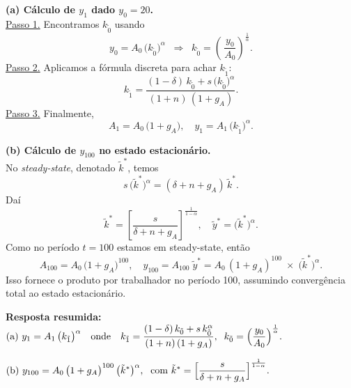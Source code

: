 \documentclass[a4paper,12pt]{article}[abntex2]
\begin{document}
\textbf{(a) Cálculo de \(y_1\) dado \(y_0=20\).}\\[3pt]
\underline{Passo 1.} Encontramos \(k_{\tilde{0}}\) usando
\[
y_0 
= 
A_0 \,\bigl(k_{\tilde{0}}\bigr)^\alpha
\;\;\Longrightarrow\;\;
k_{\tilde{0}}
=
\left(\,\frac{y_0}{A_0}\right)^{\!\frac{1}{\alpha}}.
\]
\underline{Passo 2.} Aplicamos a fórmula discreta para achar \(k_{\tilde{1}}\):
\[
k_{\tilde{1}}
=
\frac{(1-\delta)\,k_{\tilde{0}} + s\,\bigl(k_{\tilde{0}}\bigr)^\alpha}{
(1+n)\,(1+g_A)
}.
\]
\underline{Passo 3.} Finalmente,
\[
A_1 
= 
A_0\,\bigl(1+g_A\bigr),
\quad
y_1
=
A_1\,\bigl(k_{\tilde{1}}\bigr)^\alpha.
\]

\textbf{(b) Cálculo de \(y_{100}\) no estado estacionário.}\\[3pt]
No \emph{steady-state}, denotado \(\tilde{k}^*\), temos
\[
s\,\bigl(\tilde{k}^*\bigr)^\alpha
=
(\delta + n + g_A)\,\tilde{k}^*.
\]
Daí
\[
\tilde{k}^*
=
\left[
\frac{s}{\delta + n + g_A}
\right]^{\!\!\frac{1}{1-\alpha}},
\quad
\tilde{y}^* 
= 
\bigl(\tilde{k}^*\bigr)^\alpha.
\]
Como no período \(t=100\) estamos em steady-state, então
\[
A_{100}
=
A_0\,\bigl(1+g_A\bigr)^{100},
\quad
y_{100}
=
A_{100}\;\tilde{y}^*
=
A_0\,(1+g_A)^{100}\;\times\;\bigl(\tilde{k}^*\bigr)^\alpha.
\]
Isso fornece o produto por trabalhador no período 100, assumindo convergência total ao estado estacionário.

\textbf{Resposta resumida:}\\
\(\displaystyle 
\text{(a) } 
y_1 = A_1 \, \bigl(k_{\tilde{1}}\bigr)^\alpha 
\quad\text{onde}\quad
k_{\tilde{1}}
=
\frac{(1-\delta)\,k_{\tilde{0}} + s\,k_{\tilde{0}}^\alpha}{(1+n)\,(1+g_A)},
\;\;
k_{\tilde{0}}
=
\Bigl(\frac{y_0}{A_0}\Bigr)^{\frac{1}{\alpha}}.
\)


\(\displaystyle
\text{(b) }
y_{100}
=
A_0\,\bigl(1+g_A\bigr)^{100}\,\bigl(\tilde{k}^*\bigr)^\alpha,
\;\text{ com }
\tilde{k}^*
=
\Bigl[\frac{s}{\delta + n + g_A}\Bigr]^{\frac{1}{1-\alpha}}.
\)
\end{document}
